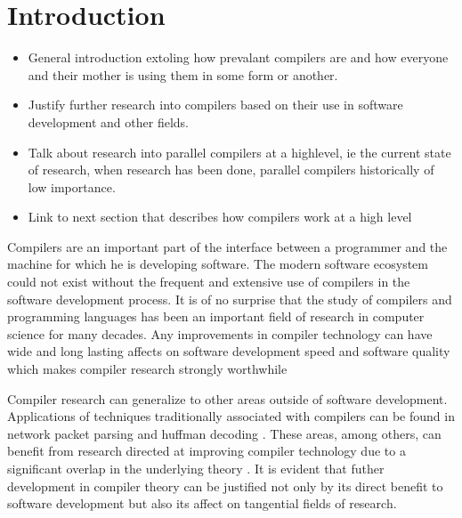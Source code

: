 \section{Introduction}
\begin{sectionplan}
     \begin{itemize}
          \item  General introduction extoling how prevalant compilers are
                 and how everyone and their mother is using them in some form
                 or another.

          \item Justify further research into compilers based on their use
                in software development and other fields.

          \item Talk about research into parallel compilers at a highlevel,
                ie the current state of research, when research has been done,
                parallel compilers historically of low importance.

          \item Link to next section that describes how compilers work at a
                high level
     \end{itemize}
\end{sectionplan}

Compilers are an important part of the interface between a programmer and the
machine for which he is developing software. The modern software ecosystem
could not exist without the frequent and extensive use of compilers in the
software development process. It is of no surprise that the study of compilers
and programming languages has been an important field of research in computer
science for many decades. Any improvements in compiler technology can have wide
and long lasting affects on software development speed and software quality
which makes compiler research strongly worthwhile \citep{hall_compiler_2009}

Compiler research can generalize to other areas outside of software development.
Applications of techniques traditionally associated with compilers can be
found in network packet parsing \citep{wang_hyperscan_2019, roesch_snort_1999}
and huffman decoding \citep{howard_parallel_1996}. These areas, among others,
can benefit from research directed at improving compiler technology due to a
significant overlap in the underlying theory
\citep{mytkowicz_data-parallel_2014}. It is evident that futher development in
compiler theory can be justified not only by its direct benefit to software
development but also its affect on tangential fields of research.

